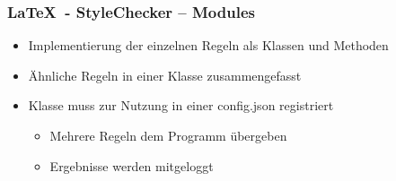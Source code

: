 \begin{frame}
\frametitle{\LaTeX~- StyleChecker -- Modules}
\begin{block}{\vspace*{-3ex}}
	\begin{itemize}
		\item Implementierung der einzelnen Regeln als Klassen und Methoden
		\item Ähnliche Regeln in einer Klasse zusammengefasst
		\item Klasse muss zur Nutzung in einer config.json registriert
		\begin{itemize}
			\item Mehrere Regeln dem Programm übergeben
			\item Ergebnisse werden mitgeloggt
		\end{itemize}
	\end{itemize}
\end{block}
\end{frame}